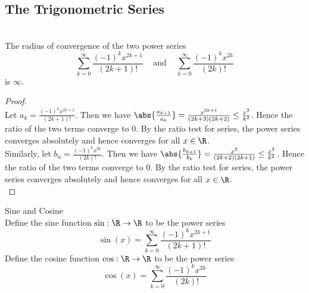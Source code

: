 \documentclass[a4paper]{article}
\begin{document}
\subsection{The Trigonometric Series}
\begin{lmm}{}{}\\
The radius of convergence of the two power series $$\sum_{k=0}^\infty\frac{(-1)^kx^{2k+1}}{(2k+1)!}\;\;\;\text{ and }\;\;\;\sum_{k=0}^\infty\frac{(-1)^kx^{2k}}{(2k)!}$$ is $\infty$. 
\begin{proof}\\
Let $a_k=\frac{(-1)^kx^{2k+1}}{(2k+1)!}$. Then we have $\abs{\frac{a_{k+1}}{a_k}}=\frac{x^{2k+1}}{(2k+3)(2k+2)}\leq\frac{x^2}{k^2}$. Hence the ratio of the two terms converge to $0$. By the ratio test for series, the power series converges absolutely and hence converges for all $x\in\R$. \\

Similarly, let $b_n=\frac{(-1)^kx^{2k}}{(2k)!}$. Then we have $\abs{\frac{b_{k+1}}{b_k}}=\frac{x^2}{(2k+2)(2k+1)}\leq\frac{x^2}{k^2}$. Hence the ratio of the two terms converge to $0$. By the ratio test for series, the power series converges absolutely and hence converges for all $x\in\R$. \\
\end{proof}
\end{lmm}

\begin{defn}{Sine and Cosine}{}\\
Define the sine function $\sin:\R\to\R$ to be the power series $$\sin(x)=\sum_{k=0}^\infty\frac{(-1)^kx^{2k+1}}{(2k+1)!}$$ Define the cosine function $\cos:\R\to\R$ to be the power series $$\cos(x)=\sum_{k=0}^\infty\frac{(-1)^kx^{2k}}{(2k)!}$$
\end{defn}
\end{document}
